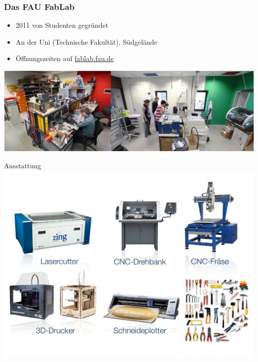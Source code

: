 \documentclass[t]{beamer}
\begin{document}
\begin{frame}
	\frametitle{Das FAU FabLab}
	\renewcommand{\baselinestretch}{1.5}
	\begin{itemize}
		\item 2011 von Studenten gegründet
		\item An der Uni (Technische Fakultät), Südgelände
		\item Öffnungszeiten auf \url{fablab.fau.de}
	\end{itemize}
\vspace{1em}
\includegraphics[width=\textwidth]{img/panorama.jpg}
\end{frame}

\begin{frame}{Ausstattung}
 \vspace{-.5em}
\includegraphics[width=\textwidth,trim=0 0 0 3em,clip]{img/ausstattung.pdf}
\end{frame}
\end{document}
